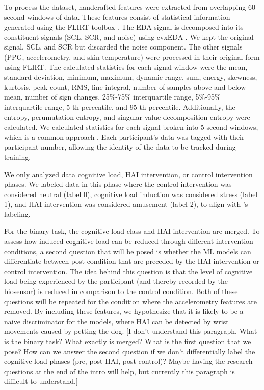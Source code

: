\documentclass[12pt]{iopart}
\begin{document}
To process the dataset, handcrafted features were extracted from overlapping 60-second windows of data.  These features consist of statistical information generated using the FLIRT toolbox \cite{foll2021flirt}.  The EDA signal is decomposed into its constituent signals (SCL, SCR, and noise) using cvxEDA \cite{greco2015cvxeda}. We kept the original signal, SCL, and SCR but discarded the noise component.  The other signals (PPG, accelerometry, and skin temperature) were processed in their original form using FLIRT.  The calculated statistics for each signal window were the mean, standard deviation, minimum, maximum, dynamic range, sum, energy, skewness, kurtosis, peak count, RMS, line integral, number of samples above and below mean, number of sign changes, 25\%-75\% interquartile range, 5\%-95\% interquartile range, 5-th percentile, and 95-th percentile.  Additionally, the entropy, perumutation entropy, and singular value decomposition entropy were calculated.  We calculated statistics for each signal broken into 5-second windows, which is a common approach \cite{schmidt2018introducing, phippsassessing}.  Each participant's data was tagged with their participant number, allowing the identity of the data to be tracked during training. 

We only analyzed data cognitive load, HAI intervention, or control intervention phases. We labeled data in this phase where the control intervention was considered neutral (label 0), cognitive load induction was considered stress (label 1), and HAI intervention was considered amusement (label 2), to align with \cite{schmidt2018introducing}'s labeling.  

For the binary task, the cognitive load class and HAI intervention are merged. To assess how induced cognitive load can be reduced through different intervention conditions, a second question that will be posed is whether the ML models can differentiate between post-condition that are preceded by the HAI intervention or control intervention.  The idea behind this question is that the level of cognitive load being experienced by the participant (and thereby recorded by the biosensor) is reduced in comparison to the control condition.  Both of these questions will be repeated for the condition where the accelerometry features are removed.  By including these features, we hypothesize that it is likely to be a naive discriminator for the models, where HAI can be detected by wrist movements caused by petting the dog. [I don't understand this paragraph. What is the binary task? What exactly is merged? What is the first question that we pose? How can we answer the second question if we don't differentially label the cognitive load phases (pre, post-HAI, post-control)? Maybe having the research questions at the end of the intro will help, but currently this paragraph is difficult to understand.]
\end{document}
